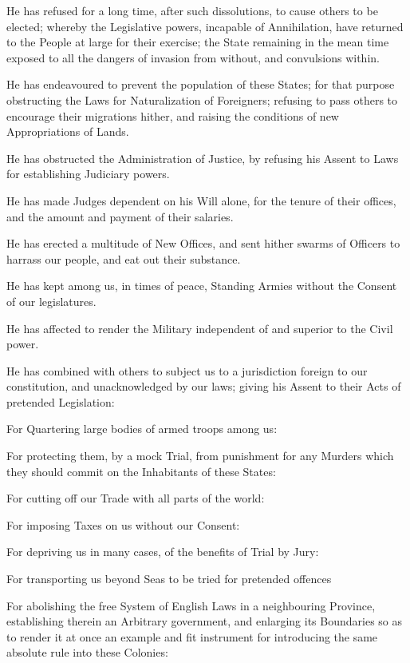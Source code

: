 \documentclass[a4paper,landscape,10pt]{article}
\begin{document}
He has refused for a long time, after such dissolutions, to cause others to be elected;
whereby the Legislative powers, incapable of Annihilation, have returned to the People at large for their exercise;
the State remaining in the mean time exposed to all the dangers of invasion from without, and convulsions within.

He has endeavoured to prevent the population of these States;
for that purpose obstructing the Laws for Naturalization of Foreigners;
refusing to pass others to encourage their migrations hither,
and raising the conditions of new Appropriations of Lands.

He has obstructed the Administration of Justice,
by refusing his Assent to Laws for establishing Judiciary powers.

He has made Judges dependent on his Will alone,
for the tenure of their offices,
and the amount and payment of their salaries.

He has erected a multitude of New Offices,
and sent hither swarms of Officers to harrass our people,
and eat out their substance.

He has kept among us, in times of peace,
Standing Armies without the Consent of our legislatures.

He has affected to render the Military independent of and superior to the Civil power.

He has combined with others to subject us to a jurisdiction foreign to our constitution,
and unacknowledged by our laws; giving his Assent to their Acts of pretended Legislation:

For Quartering large bodies of armed troops among us:

For protecting them, by a mock Trial,
from punishment for any Murders
which they should commit on the Inhabitants of these States:

For cutting off our Trade with all parts of the world:

For imposing Taxes on us without our Consent:

For depriving us in many cases, of the benefits of Trial by Jury:

For transporting us beyond Seas to be tried for pretended offences

For abolishing the free System of English Laws in a neighbouring Province,
establishing therein an Arbitrary government,
and enlarging its Boundaries so as to render it at once an example and fit instrument
for introducing the same absolute rule into these Colonies:
\end{document}
